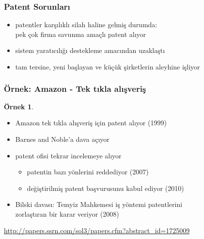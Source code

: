 \documentclass[dvipsnames]{beamer}
\theoremstyle{definition}
\theoremstyle{example}
\newtheorem{ornek}[theorem]{Örnek}
\theoremstyle{plain}
\begin{document}
\begin{frame}
  \frametitle{Patent Sorunları}

  \begin{itemize}
    \item patentler karşılıklı silah haline gelmiş durumda:\\
      pek çok firma savunma amaçlı patent alıyor

    \pause
    \medskip
    \item sistem yaratıcılığı destekleme amacından uzaklaştı
    \item tam tersine, yeni başlayan ve küçük şirketlerin aleyhine işliyor
  \end{itemize}
\end{frame}

\begin{frame}
  \frametitle{Örnek: Amazon - Tek tıkla alışveriş}

  \begin{ornek}
    \begin{itemize}
      \item Amazon tek tıkla alışveriş için patent alıyor (1999)
      \item Barnes and Noble'a dava açıyor
      \item patent ofisi tekrar incelemeye alıyor
      \begin{itemize}
        \item patentin bazı yönlerini reddediyor (2007)
        \item değiştirilmiş patent başvurusunu kabul ediyor (2010)
      \end{itemize}

      \pause
      \medskip
      \item Bilski davası: Temyiz Mahkemesi iş yöntemi patentlerini\\
        zorlaştıran bir karar veriyor (2008)
    \end{itemize}
  \end{ornek}

  \medskip
  \tiny{\url{http://papers.ssrn.com/sol3/papers.cfm?abstract_id=1725009}}\\
\end{frame}
\end{document}
